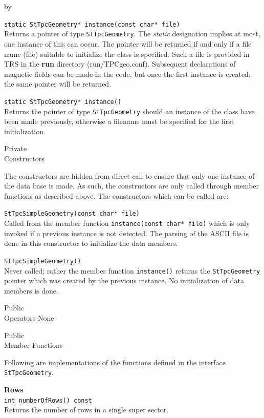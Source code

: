 \documentclass[twoside]{article}
\newcommand{\comp}[1]{\texttt{#1}}%
\newcommand{\entrylabel}[1]{\mbox{\textbf{{#1}}}\hfil}%
\newenvironment{entry}
{\begin{list}{}%
    {\renewcommand{\makelabel}{\entrylabel}%
     \setlength{\labelwidth}{90pt}%
     \setlength{\leftmargin}{\labelwidth}
     \advance\leftmargin by \labelsep%
      }%
    }%
  {\end{list}}
\newcommand{\Entrylabel}[1]%
{\raisebox{0pt}[1ex][0pt]{\makebox[\labelwidth][l]%
    {\parbox[t]{\labelwidth}{\hspace{0pt}\textbf{{#1}}}}}}
\newenvironment{Entry}%
{\renewcommand{\entrylabel}{\Entrylabel}\begin{entry}}%
  {\end{entry}}
\begin{document}
\begin{Entry}
   \verb+static StTpcGeometry* instance(const char* file)+\\
   Returns a pointer of type \comp{StTpcGeometry}.  The {\em static}
   designation implies at most, one instance of this can occur.
   The pointer will be returned if and only if a file name (file) 
   suitable to initialize the class is specified.  Such a file
   is provided in TRS in the {\bf run} directory (run/TPCgeo.conf).
   Subsequent 
   declarations of magnetic fields can be made in the code, but
   once the first instance is created, the same pointer will
   be returned.

   \verb+static StTpcGeometry* instance()+\\
   Returns the pointer of type \comp{StTpcGeometry} should an instance
   of the class have been made previously, otherwise a filename
   must be specified for the first initialization.

\item[Private \\ Constructors]

   The constructors are hidden from direct call to ensure that
   only one instance of the data base is made.  As such, the
   constructors are only called through member functions
   as described above.  The constructors which can be called are:

   \verb+StTpcSimpleGeometry(const char* file)+\\
   Called from the member function \texttt{instance(const char* file)}
   which is only invoked if a previous instance is not detected.
   The parsing of the ASCII file is done in this constructor to
   initialize the data members.

   \verb+StTpcSimpleGeometry()+\\
   Never called; rather the member function \texttt{instance()}
   returns the \comp{StTpcGeometry} pointer which was created by
   the previous instance.  No initialization of data members is done.

\item[Public \\ Operators]
   None

\item[Public \\ Member Functions]

  Following are implementations of the functions defined in
  the interface \comp{StTpcGeometry}.

  {\bf Rows \\}
  \verb+int numberOfRows() const+\\
  Returns the number of rows in a single super sector.


\end{Entry}
\end{document}
